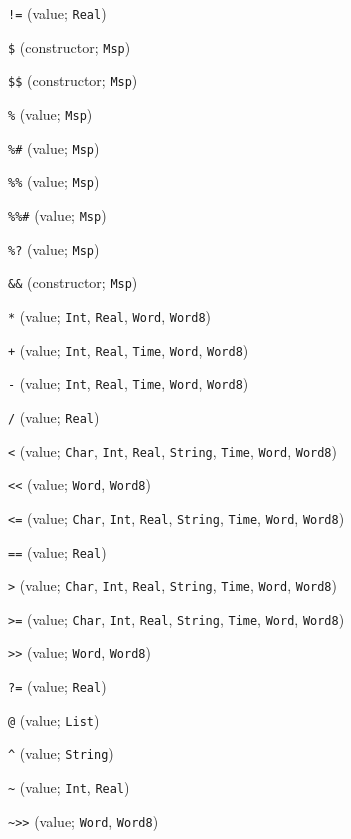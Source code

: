 \begin{description}\small
\item[] \verb"!=" (value; \verb"Real")
\item[] \verb"$" (constructor; \verb"Msp")
\item[] \verb"$$" (constructor; \verb"Msp")
\item[] \verb"%" (value; \verb"Msp")
\item[] \verb"%#" (value; \verb"Msp")
\item[] \verb"%%" (value; \verb"Msp")
\item[] \verb"%%#" (value; \verb"Msp")
\item[] \verb"%?" (value; \verb"Msp")
\item[] \verb"&&" (constructor; \verb"Msp")
\item[] \verb"*" (value; \verb"Int", \verb"Real", \verb"Word", \verb"Word8")
\item[] \verb"+" (value; \verb"Int", \verb"Real", \verb"Time", \verb"Word", \verb"Word8")
\item[] \verb"-" (value; \verb"Int", \verb"Real", \verb"Time", \verb"Word", \verb"Word8")
\item[] \verb"/" (value; \verb"Real")
\item[] \verb"<" (value; \verb"Char", \verb"Int", \verb"Real", \verb"String", \verb"Time", \verb"Word", \verb"Word8")
\item[] \verb"<<" (value; \verb"Word", \verb"Word8")
\item[] \verb"<=" (value; \verb"Char", \verb"Int", \verb"Real", \verb"String", \verb"Time", \verb"Word", \verb"Word8")
\item[] \verb"==" (value; \verb"Real")
\item[] \verb">" (value; \verb"Char", \verb"Int", \verb"Real", \verb"String", \verb"Time", \verb"Word", \verb"Word8")
\item[] \verb">=" (value; \verb"Char", \verb"Int", \verb"Real", \verb"String", \verb"Time", \verb"Word", \verb"Word8")
\item[] \verb">>" (value; \verb"Word", \verb"Word8")
\item[] \verb"?=" (value; \verb"Real")
\item[] \verb"@" (value; \verb"List")
\item[] \verb"^" (value; \verb"String")
\item[] \verb"~" (value; \verb"Int", \verb"Real")
\item[] \verb"~>>" (value; \verb"Word", \verb"Word8")
\\[2ex]


\end{description}
